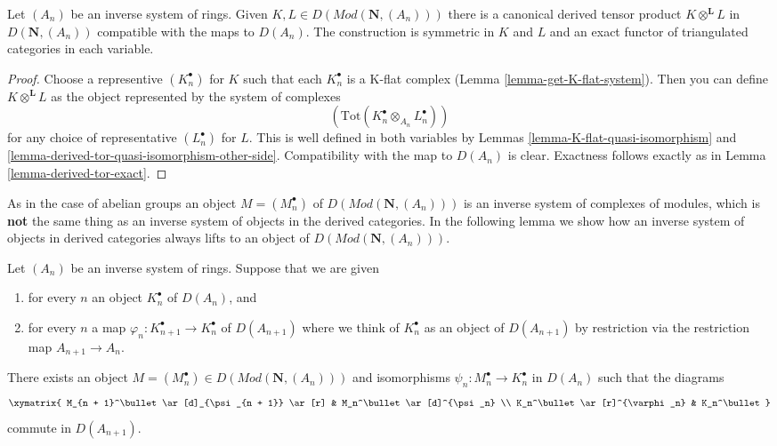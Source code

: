\begin{lemma}
\label{lemma-derived-tensor-product-systems}
Let $(A_n)$ be an inverse system of rings. Given
$K, L \in D(\textit{Mod}(\mathbf{N}, (A_n)))$ there is a canonical derived
tensor product $K \otimes^\mathbf{L} L$ in $D(\mathbf{N}, (A_n))$
compatible with the maps to $D(A_n)$. The construction is symmetric
in $K$ and $L$ and an exact functor of triangulated categories in
each variable.
\end{lemma}

\begin{proof}
Choose a representive $(K_n^\bullet)$ for $K$ such that each $K_n^\bullet$
is a K-flat complex (Lemma \ref{lemma-get-K-flat-system}).
Then you can define $K \otimes^\mathbf{L} L$ as the object represented by
the system of complexes
$$
(\text{Tot}(K_n^\bullet \otimes_{A_n} L_n^\bullet))
$$
for any choice of representative $(L_n^\bullet)$ for $L$.
This is well defined in both variables by
Lemmas \ref{lemma-K-flat-quasi-isomorphism} and
\ref{lemma-derived-tor-quasi-isomorphism-other-side}.
Compatibility with the map to $D(A_n)$ is clear.
Exactness follows exactly as in
Lemma \ref{lemma-derived-tor-exact}.
\end{proof}

\noindent
As in the case of abelian groups an object $M = (M_n^\bullet)$ of
$D(\textit{Mod}(\mathbf{N}, (A_n)))$ is an inverse system of complexes
of modules, which is {\bf not} the same thing as an inverse system of
objects in the derived categories. In the following lemma we show
how an inverse system of objects in derived categories always lifts
to an object of $D(\textit{Mod}(\mathbf{N}, (A_n)))$.

\begin{lemma}
\label{lemma-lift-to-system-complexes}
Let $(A_n)$ be an inverse system of rings. Suppose that we are given
\begin{enumerate}
\item for every $n$ an object $K_n^\bullet$ of $D(A_n)$, and
\item for every $n$ a map $\varphi_n : K_{n + 1}^\bullet \to K^\bullet_n$ of
$D(A_{n + 1})$ where we think of $K_n^\bullet$ as an object of $D(A_{n + 1})$
by restriction via the restriction map $A_{n + 1} \to A_n$.
\end{enumerate}
There exists an object
$M = (M_n^\bullet) \in D(\textit{Mod}(\mathbf{N}, (A_n)))$
and isomorphisms $\psi_n : M_n^\bullet \to K_n^\bullet$ in $D(A_n)$
such that the diagrams
$$
\xymatrix{
M_{n + 1}^\bullet \ar[d]_{\psi_{n + 1}} \ar[r] &
M_n^\bullet \ar[d]^{\psi_n} \\
K_n^\bullet \ar[r]^{\varphi_n} & K_n^\bullet
}
$$
commute in $D(A_{n + 1})$.
\end{lemma}


